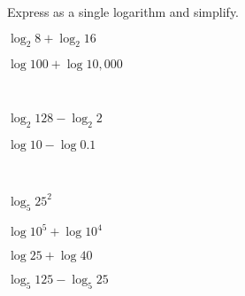 \documentclass{report}
\theoremstyle{definition}
\begin{document}
\noindent Express as a single logarithm and simplify.\\


\begin{enumerate}

	\begin{minipage}[t]{0.45\linewidth}
		\item $\log_2 8 + \log_2 16$
	\end{minipage}
	\hfill
	\begin{minipage}[t]{0.45\linewidth}
		\item $\log 100 + \log 10,000$
	\end{minipage}
	\vspace{3cm}
	
\hspace{-2cm}  \\

	\begin{minipage}[t]{0.45\linewidth}
		\item  $\log_2 128 - \log_2 2$
	\end{minipage}
	\hfill
	\begin{minipage}[t]{0.45\linewidth}
		\item $\log 10 - \log 0.1$
	\end{minipage}
	\vspace{3cm}
	
\hspace{-2cm}  \\

	\begin{minipage}[t]{0.45\linewidth}
		\item $\log_5 25^2$ 
	\end{minipage}
	\hfill
	\begin{minipage}[t]{0.45\linewidth}
		\item $\log 10^5 + \log 10^4$
	\end{minipage}
	
	\vspace{4cm}
	
	\begin{minipage}[t]{0.45\linewidth}
		\item $\log 25 + \log 40$
	\end{minipage}
	\hfill
	\begin{minipage}[t]{0.45\linewidth}
		\item $\log_5 125 - \log_5 25$
	\end{minipage}
	
	\vspace{4cm}
	

\end{enumerate}
\end{document}

